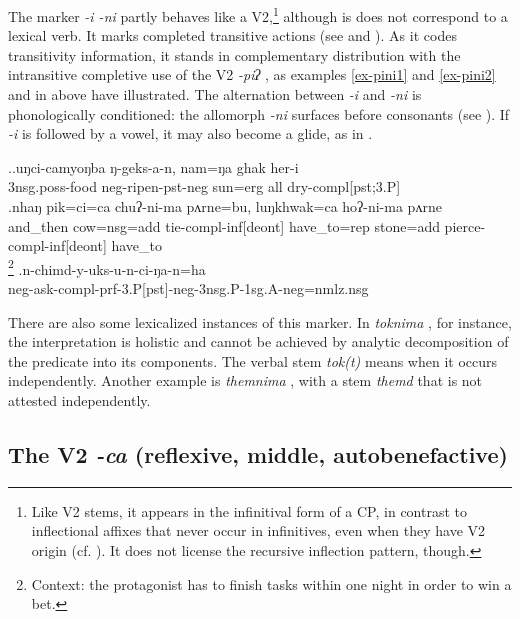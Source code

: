 The marker  \emph{-i \ti -ni}  partly behaves like a V2,\footnote{Like V2 stems, it appears in the infinitival form of a CP, in contrast to inflectional affixes that never occur in infinitives, even when they have V2 origin (cf. ). It does not license the recursive inflection pattern, though.} although is does  not  correspond to a lexical verb. It  marks  completed transitive actions (see \Next and ). As it codes transitivity information, it stands in complementary distribution with the intransitive completive use of the V2 \emph{-piʔ} , as examples \ref{ex-pini1} and \ref{ex-pini2} and  in   above have illustrated. The  alternation between \emph{-i} and \emph{-ni} is phonologically conditioned: the allomorph \emph{-ni} surfaces before consonants (see ). If \emph{-i} is followed by a vowel, it may also become a glide, as in \Next[c].

\ex.\ag.uŋci-camyoŋba  ŋ-geks-a-n,   nam=ŋa   ghak her-i\\
{\sc 3nsg.poss-}food {\sc neg-}ripen{\sc [3sg]-pst-neg} sun{\sc =erg} all dry{\sc -compl[pst;3.P]}\\
\bg.nhaŋ     pik=ci=ca  chuʔ-ni-ma     pʌrne=bu,  luŋkhwak=ca  hoʔ-ni-ma     pʌrne\\
and\_then cow{\sc =nsg=add} tie{\sc -compl-inf[deont]} have\_to{\sc =rep}  stone{\sc =add}  pierce{\sc -compl-inf[deont]} have\_to\\
\footnote{Context: the protagonist has to finish tasks within one night in order to win a bet.} 
\bg.n-chimd-y-uks-u-n-ci-ŋa-n=ha\\
{\sc neg-}ask{\sc -compl-prf-3.P[pst]-neg-3nsg.P-1sg.A-neg=nmlz.nsg}\\

There are also some  lexicalized instances of this marker. In \emph{toknima} , for instance, the interpretation is holistic and cannot be achieved by analytic decomposition of the predicate into its components. The verbal stem \emph{tok(t)} means  when it occurs independently. Another example is \emph{themnima} , with a stem \emph{themd} that is not attested independently.


\subsection{The V2 \emph{-ca} (reflexive, middle, autobenefactive)}\label{V2-eat}%

